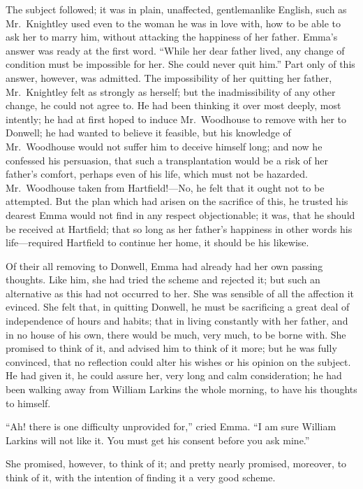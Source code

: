 The subject followed; it was in plain, unaffected, gentlemanlike English,
such as Mr.\ Knightley used even to the woman he was in love with,
how to be able to ask her to marry him, without attacking the
happiness of her father.  Emma's answer was ready at the first word.
``While her dear father lived, any change of condition must be impossible
for her.  She could never quit him.''  Part only of this answer,
however, was admitted.  The impossibility of her quitting her father,
Mr.\ Knightley felt as strongly as herself; but the inadmissibility
of any other change, he could not agree to.  He had been thinking
it over most deeply, most intently; he had at first hoped to induce
Mr.\ Woodhouse to remove with her to Donwell; he had wanted to believe
it feasible, but his knowledge of Mr.\ Woodhouse would not suffer
him to deceive himself long; and now he confessed his persuasion,
that such a transplantation would be a risk of her father's comfort,
perhaps even of his life, which must not be hazarded.  Mr.\ Woodhouse
taken from Hartfield!---No, he felt that it ought not to be attempted.
But the plan which had arisen on the sacrifice of this, he trusted
his dearest Emma would not find in any respect objectionable;
it was, that he should be received at Hartfield; that so long as
her father's happiness in other words his life---required Hartfield
to continue her home, it should be his likewise.

Of their all removing to Donwell, Emma had already had her own
passing thoughts.  Like him, she had tried the scheme and rejected it;
but such an alternative as this had not occurred to her.
She was sensible of all the affection it evinced.  She felt that,
in quitting Donwell, he must be sacrificing a great deal of independence
of hours and habits; that in living constantly with her father,
and in no house of his own, there would be much, very much,
to be borne with.  She promised to think of it, and advised him
to think of it more; but he was fully convinced, that no reflection
could alter his wishes or his opinion on the subject.  He had
given it, he could assure her, very long and calm consideration;
he had been walking away from William Larkins the whole morning,
to have his thoughts to himself.

``Ah! there is one difficulty unprovided for,'' cried Emma.  ``I am
sure William Larkins will not like it.  You must get his consent
before you ask mine.''

She promised, however, to think of it; and pretty nearly promised, moreover,
to think of it, with the intention of finding it a very good scheme.


